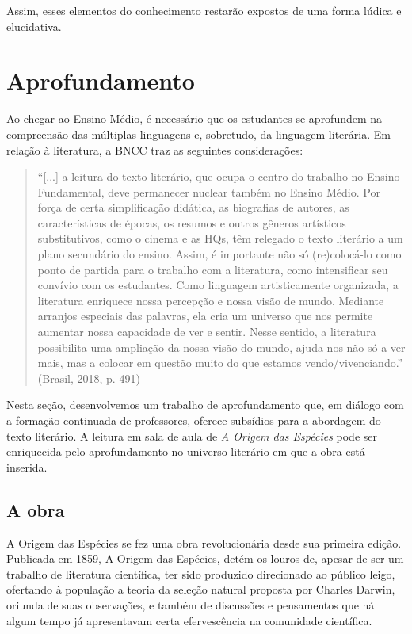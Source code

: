 \documentclass[12pt]{extarticle}
\begin{document}
Assim, esses elementos do conhecimento restarão expostos de uma forma lúdica
e elucidativa.

\section{Aprofundamento}

Ao chegar ao Ensino Médio, é necessário que os estudantes se aprofundem na
compreensão das múltiplas linguagens e, sobretudo, da linguagem literária. Em
relação à literatura, a BNCC traz as seguintes considerações:

\begin{quotation} ``{[}...{]} a leitura do texto literário, que ocupa o centro
  do trabalho no Ensino Fundamental, deve permanecer nuclear também no Ensino
  Médio.  Por força de certa simplificação didática, as biografias de autores,
  as características de épocas, os resumos e outros gêneros artísticos
  substitutivos, como o cinema e as HQs, têm relegado o texto literário a um
  plano secundário do ensino. Assim, é importante não só (re)colocá-lo como
  ponto de partida para o trabalho com a literatura, como intensificar seu
  convívio com os estudantes. Como linguagem artisticamente organizada,
  a literatura enriquece nossa percepção e nossa visão de mundo. Mediante
  arranjos especiais das palavras, ela cria um universo que nos permite
  aumentar nossa capacidade de ver e sentir.  Nesse sentido, a literatura
  possibilita uma ampliação da nossa visão do mundo, ajuda-nos não só a ver
  mais, mas a colocar em questão muito do que estamos vendo/vivenciando.''
(Brasil, 2018, p. 491) \end{quotation}

Nesta seção, desenvolvemos um trabalho de aprofundamento que, em diálogo com
a formação continuada de professores, oferece subsídios para a abordagem do
texto literário. A leitura em sala de aula de \emph{A Origem das Espécies} pode
ser enriquecida pelo aprofundamento no universo literário em que a obra está
inserida.

\subsection{A obra}

A Origem das Espécies se fez uma obra revolucionária desde sua primeira edição.
Publicada em 1859, A Origem das Espécies, detém os louros de, apesar de ser um
trabalho de literatura científica, ter sido produzido direcionado ao público
leigo, ofertando à população a teoria da seleção natural proposta por Charles
Darwin, oriunda de suas observações, e também de discussões e pensamentos que
há algum tempo já apresentavam certa efervescência na comunidade científica.
\end{document}
